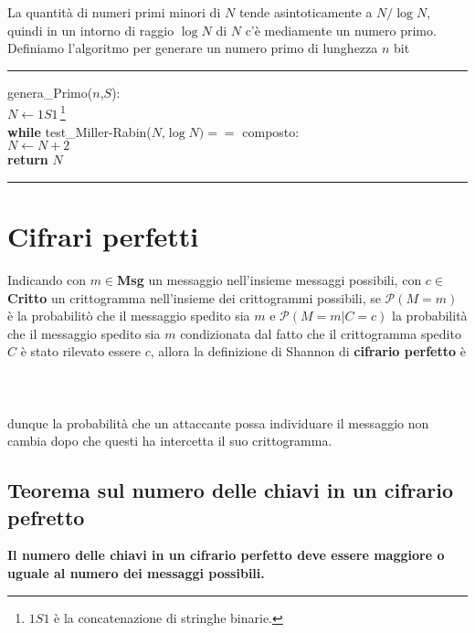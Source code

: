 \documentclass{article}
\begin{document}
La quantità di numeri primi minori di $N$ tende asintoticamente a $N/\log{N}$, quindi in un intorno di raggio $\log{N}$ di $N$ c'è mediamente un numero primo. Definiamo l'algoritmo per generare un numero primo di lunghezza $n$ bit\hrule genera\_Primo($n$,$S$):\\

\indent\indent $N\leftarrow 1S1$\,\footnote{$1S1$ è la concatenazione di stringhe binarie.}\\

\indent\indent \textbf{while} test\_Miller-Rabin($N$,$\log N)==$ composto:\\
\indent\indent\indent $N\leftarrow N+2$\\

\indent\indent \textbf{return} $N$\\

\hrule

\newpage

\section{Cifrari perfetti}

Indicando con $m\in$\textbf{Msg} un messaggio nell'insieme messaggi possibili, con $c\in$\textbf{Critto} un crittogramma nell'insieme dei crittogrammi possibili, se $\mathcal{P}(M=m)$ è la probabilitò che il messaggio spedito sia $m$ e $\mathcal{P}(M=m|C=c)$ la probabilità che il messaggio spedito sia $m$ condizionata dal fatto che il crittogramma spedito $C$ è stato rilevato essere $c$, allora la definizione di Shannon di \textbf{cifrario perfetto} è\\
\\
\\
\\
dunque la probabilità che un attaccante possa individuare il messaggio non cambia dopo che questi ha intercetta il suo crittogramma.
\subsection{Teorema sul numero delle chiavi in un cifrario pefretto}

\textbf{Il numero delle chiavi in un cifrario perfetto deve essere maggiore o uguale al numero dei messaggi possibili.}
\end{document}
